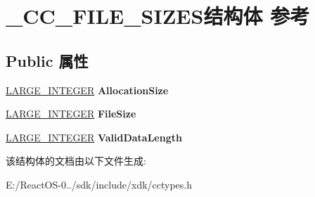 \hypertarget{struct___c_c___f_i_l_e___s_i_z_e_s}{}\section{\+\_\+\+C\+C\+\_\+\+F\+I\+L\+E\+\_\+\+S\+I\+Z\+E\+S结构体 参考}
\label{struct___c_c___f_i_l_e___s_i_z_e_s}
\subsection*{Public 属性}
\begin{DoxyCompactItemize}
\item 
\mbox{\label{struct___c_c___f_i_l_e___s_i_z_e_s_af354a6890aeb2c30c36cace4b3f79f75}} 
\hyperlink{union___l_a_r_g_e___i_n_t_e_g_e_r}{L\+A\+R\+G\+E\+\_\+\+I\+N\+T\+E\+G\+ER} {\bfseries Allocation\+Size}
\item 
\mbox{\label{struct___c_c___f_i_l_e___s_i_z_e_s_a08be9a7a7cae57d9530aef2e7d6adffe}} 
\hyperlink{union___l_a_r_g_e___i_n_t_e_g_e_r}{L\+A\+R\+G\+E\+\_\+\+I\+N\+T\+E\+G\+ER} {\bfseries File\+Size}
\item 
\mbox{\label{struct___c_c___f_i_l_e___s_i_z_e_s_a81e27bb07a999f1baca9ec44ee29e8ff}} 
\hyperlink{union___l_a_r_g_e___i_n_t_e_g_e_r}{L\+A\+R\+G\+E\+\_\+\+I\+N\+T\+E\+G\+ER} {\bfseries Valid\+Data\+Length}
\end{DoxyCompactItemize}


该结构体的文档由以下文件生成\+:\begin{DoxyCompactItemize}
\item 
E\+:/\+React\+O\+S-\/0../sdk/include/xdk/cctypes.\+h\end{DoxyCompactItemize}
